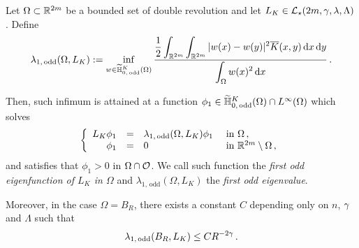 \begin{lemma}
	\label{Lemma:FirstOddEigenfunction}
	Let $\Omega\subset \mathbb{R}^{2m} $ be a bounded set of double revolution and let $L_K\in \mathcal{L}_\star(2m,\gamma,\lambda, \Lambda)$. Define 
	\begin{equation}
	\label{Eq:DefLambda1}
	\lambda_{1, \, \mathrm{odd}}(\Omega, L_K) := \inf_{w \in \widetilde{\mathbb{H}}^K_{0, \, \mathrm{odd}}(\Omega)} \dfrac{\dfrac{1}{2}  \displaystyle\int_{\mathbb{R}^{2m}} \int_{\mathbb{R}^{2m}} |w(x) - w(y)|^2 \overline{K}(x,y) \,\mathrm{d} x \,\mathrm{d} y}{ \displaystyle \int_\Omega w(x)^2 \,\mathrm{d} x}\,.
	\end{equation}
	
	Then, such infimum is attained at a function $\phi_1\in \widetilde{\mathbb{H}}^K_{0, \, \mathrm{odd}}(\Omega)\cap L^\infty(\Omega)$ which solves
	$$
	\left\{\begin{array}{rcll}
	L_K \phi_1 &=& \lambda_{1, \, \mathrm{odd}}(\Omega, L_K) \phi_1 & \textrm{ in } \Omega\,,\\
	\phi_1 & = & 0 & \textrm{ in } \mathbb{R}^{2m}\setminus \Omega\,,
	\end{array} \right.
	$$
	and satisfies that $\phi_1 > 0$ in $\Omega \cap \mathcal{O}$.
	We call such function the \emph{first odd eigenfunction of $L_K$ in $\Omega$} and $\lambda_{1, \, \mathrm{odd}}(\Omega, L_K) $ the \emph{first odd eigenvalue}. 
	
	Moreover, in the case $\Omega = B_R$, there exists a constant $C$ depending only on $n$, $\gamma$ and $\Lambda$ such that
	$$
	\lambda_{1, \, \mathrm{odd}}(B_R, L_K) \leq C R^{-2\gamma}\,. 
	$$ 
\end{lemma}


